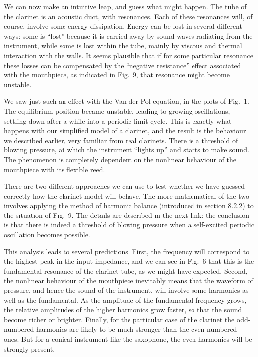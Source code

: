   We can now make an intuitive leap, and guess what might happen. The tube of 
  the clarinet is an acoustic duct, with resonances. Each of these resonances 
  will, of course, involve some energy dissipation. Energy can be lost in 
  several different ways: some is “lost” because it is carried away by sound 
  waves radiating from the instrument, while some is lost within the tube, 
  mainly by viscous and thermal interaction with the walls. It seems plausible 
  that if for some particular resonance these losses can be compensated by the 
  “negative resistance” effect associated with the mouthpiece, as indicated in 
  Fig.\ 9, that resonance might become unstable. 

  We saw just such an effect with the Van der Pol equation, in the plots of 
  Fig.\ 1. The equilibrium position became unstable, leading to growing 
  oscillations, settling down after a while into a periodic limit cycle. This 
  is exactly what happens with our simplified model of a clarinet, and the 
  result is the behaviour we described earlier, very familiar from real 
  clarinets. There is a threshold of blowing pressure, at which the instrument 
  “lights up” and starts to make sound. The phenomenon is completely dependent 
  on the nonlinear behaviour of the mouthpiece with its flexible reed. 

  There are two different approaches we can use to test whether we have guessed 
  correctly how the clarinet model will behave. The more mathematical of the 
  two involves applying the method of harmonic balance (introduced in section 
  8.2.2) to the situation of Fig.\ 9. The details are described in the next 
  link: the conclusion is that there is indeed a threshold of blowing pressure 
  when a self-excited periodic oscillation becomes possible. 

  This analysis leads to several predictions. First, the frequency will 
  correspond to the highest peak in the input impedance, and we can see in 
  Fig.\ 6 that this is the fundamental resonance of the clarinet tube, as we 
  might have expected. Second, the nonlinear behaviour of the mouthpiece 
  inevitably means that the waveform of pressure, and hence the sound of the 
  instrument, will involve some harmonics as well as the fundamental. As the 
  amplitude of the fundamental frequency grows, the relative amplitudes of the 
  higher harmonics grow faster, so that the sound become richer or brighter. 
  Finally, for the particular case of the clarinet the odd-numbered harmonics 
  are likely to be much stronger than the even-numbered ones. But for a conical 
  instrument like the saxophone, the even harmonics will be strongly present. 


